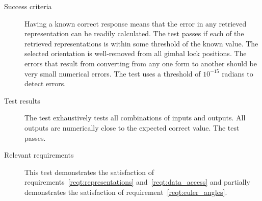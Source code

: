 \begin{description}
\item[Success criteria]
Having a known correct response means that the error in any retrieved
representation can be readily calculated. The test passes if each of the
retrieved representations is within some threshold of the known value.
The selected orientation is well-removed from all gimbal lock positions.
The errors that result from converting from any one form to another should be
very small numerical errors. The test uses a threshold of $10^{-15}$ radians to
detect errors.

\item[Test results]
The test exhaustively tests all combinations of inputs and outputs. All outputs
are numerically close to the expected correct value. The test passes.

\item[Relevant requirements]
This test demonstrates the satisfaction of
requirements~\ref{reqt:representations} and~\ref{reqt:data_access}
and partially demonstrates the satisfaction of
requirement~\ref{reqt:euler_angles}.

\end{description}
